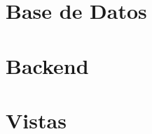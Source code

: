 \documentclass{article}
\begin{document}
\tableofcontents

\section{Base de Datos}

\section{Backend}



\section{Vistas}


\end{document}
